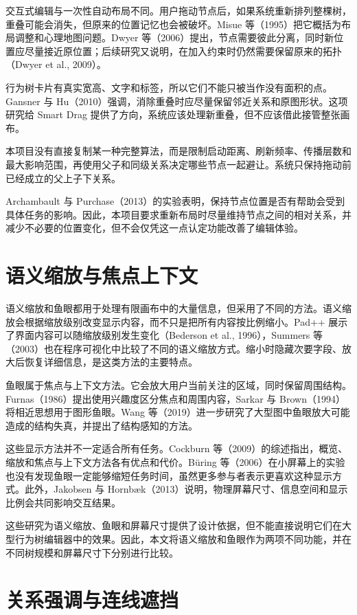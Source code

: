 \documentclass[11pt,a4paper,oneside,extrafontsizes]{memoir}
\begin{document}
交互式编辑与一次性自动布局不同。用户拖动节点后，如果系统重新排列整棵树，重叠可能会消失，但原来的位置记忆也会被破坏。Misue 等（1995）把它概括为布局调整和心理地图问题。Dwyer 等（2006）提出，节点需要彼此分离，同时新位置应尽量接近原位置；后续研究又说明，在加入约束时仍然需要保留原来的拓扑（Dwyer et al., 2009）。

行为树卡片有真实宽高、文字和标签，所以它们不能只被当作没有面积的点。Gansner 与 Hu（2010）强调，消除重叠时应尽量保留邻近关系和原图形状。这项研究给 Smart Drag 提供了方向，系统应该处理新重叠，但不应该借此接管整张画布。

本项目没有直接复制某一种完整算法，而是限制启动距离、刷新频率、传播层数和最大影响范围，再使用父子和同级关系决定哪些节点一起避让。系统只保持拖动前已经成立的父上子下关系。

Archambault 与 Purchase（2013）的实验表明，保持节点位置是否有帮助会受到具体任务的影响。因此，本项目要求重新布局时尽量维持节点之间的相对关系，并减少不必要的位置变化，但不会仅凭这一点认定功能改善了编辑体验。

\section{语义缩放与焦点上下文}

语义缩放和鱼眼都用于处理有限画布中的大量信息，但采用了不同的方法。语义缩放会根据缩放级别改变显示内容，而不只是把所有内容按比例缩小。Pad++ 展示了界面内容可以随缩放级别发生变化（Bederson et al., 1996），Summers 等（2003）也在程序可视化中比较了不同的语义缩放方式。缩小时隐藏次要字段、放大后恢复详细信息，是这类方法的主要特点。

鱼眼属于焦点与上下文方法。它会放大用户当前关注的区域，同时保留周围结构。Furnas（1986）提出使用兴趣度区分焦点和周围内容，Sarkar 与 Brown（1994）将相近思想用于图形鱼眼。Wang 等（2019）进一步研究了大型图中鱼眼放大可能造成的结构失真，并提出了结构感知的方法。

这些显示方法并不一定适合所有任务。Cockburn 等（2009）的综述指出，概览、缩放和焦点与上下文方法各有优点和代价。Büring 等（2006）在小屏幕上的实验也没有发现鱼眼一定能够缩短任务时间，虽然更多参与者表示更喜欢这种显示方式。此外，Jakobsen 与 Hornbæk（2013）说明，物理屏幕尺寸、信息空间和显示比例会共同影响交互结果。

这些研究为语义缩放、鱼眼和屏幕尺寸提供了设计依据，但不能直接说明它们在大型行为树编辑器中的效果。因此，本文将语义缩放和鱼眼作为两项不同功能，并在不同树规模和屏幕尺寸下分别进行比较。

\section{关系强调与连线遮挡}
\end{document}
